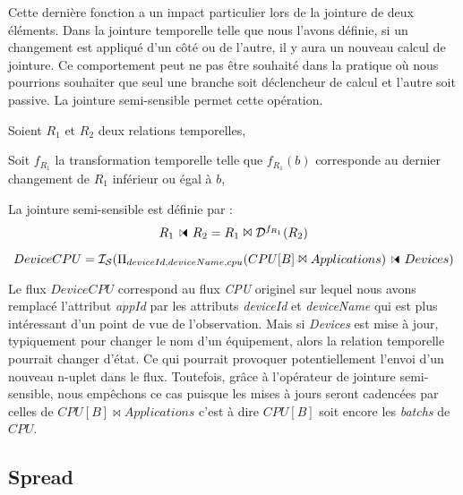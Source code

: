 Cette dernière fonction a un impact particulier lors de la jointure de deux éléments. Dans la jointure temporelle telle que nous l'avons définie, si un changement est appliqué d'un côté ou de l'autre, il y aura un nouveau calcul de jointure. Ce comportement peut ne pas être souhaité dans la pratique où nous pourrions souhaiter que seul une branche soit déclencheur de calcul et l'autre soit passive. La jointure semi-sensible permet cette opération.


\begin{defi}
    Soient $R_1$ et $R_2$ deux relations temporelles,

    Soit $f_{R_1}$ la transformation temporelle telle que $f_{R_1}(b)$ corresponde au dernier changement de $R_1$ inférieur ou égal à $b$,

    La jointure semi-sensible est définie par :
        $$R_1\ssjoin R_2 = R_1 \Join \D^{f_{R_1}}(R_2)$$
\end{defi}
\begin{example}
    $$DeviceCPU=\IS(\Pi_{deviceId,deviceName,cpu}(CPU[B]\Join Applications)\ssjoin Devices)$$

Le flux $DeviceCPU$ correspond au flux \textit{CPU} originel sur lequel nous avons remplacé l'attribut \textit{appId} par les attributs \textit{deviceId} et \textit{deviceName} qui est plus intéressant d'un point de vue de l'observation. Mais si \textit{Devices} est mise à jour, typiquement pour changer le nom d'un équipement, alors la relation temporelle pourrait changer d'état. Ce qui pourrait provoquer potentiellement l'envoi d'un nouveau n-uplet dans le flux. Toutefois, grâce à l'opérateur de jointure semi-sensible, nous empêchons ce cas puisque les mises à jours seront cadencées par celles de $CPU[B]\Join Applications$ c'est à dire $CPU[B]$ soit encore les \textit{batchs} de $CPU$.
\end{example}

\subsection{Spread}